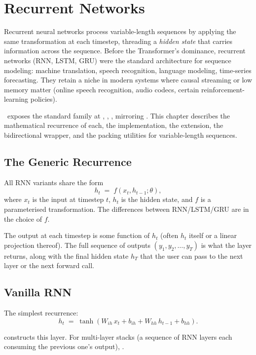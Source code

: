 \chapter{Recurrent Networks}
\label{ch:rnn_family}

Recurrent neural networks process variable-length sequences by
applying the same transformation at each timestep, threading a
\emph{hidden state} that carries information across the sequence.
Before the Transformer's dominance, recurrent networks (RNN, LSTM,
GRU) were the standard architecture for sequence modeling: machine
translation, speech recognition, language modeling, time-series
forecasting. They retain a niche in modern systems where causal
streaming or low memory matter (online speech recognition, audio
codecs, certain reinforcement-learning policies).

\Lucid\ exposes the standard family at
, , ,
mirroring . This chapter describes the
mathematical recurrence of each, the implementation, the
 extension, the bidirectional wrapper, and the
packing utilities for variable-length sequences.

\section{The Generic Recurrence}
\label{sec:rnn_family:generic}

All RNN variants share the form
\[
h_t \;=\; f(x_t, h_{t-1}; \theta),
\]
where $x_t$ is the input at timestep $t$, $h_t$ is the hidden
state, and $f$ is a parameterised transformation. The differences
between RNN/LSTM/GRU are in the choice of $f$.

The output at each timestep is some function of $h_t$ (often
$h_t$ itself or a linear projection thereof). The full sequence
of outputs $(y_1, y_2, \ldots, y_T)$ is what the layer returns,
along with the final hidden state $h_T$ that the user can pass to
the next layer or the next forward call.

\section{Vanilla RNN}
\label{sec:rnn_family:vanilla_rnn}

The simplest recurrence:
\[
h_t \;=\; \tanh(W_{ih}\, x_t + b_{ih} + W_{hh}\, h_{t-1} + b_{hh}).
\]

 constructs this layer.
For multi-layer stacks (a sequence of RNN layers each consuming
the previous one's output), .

